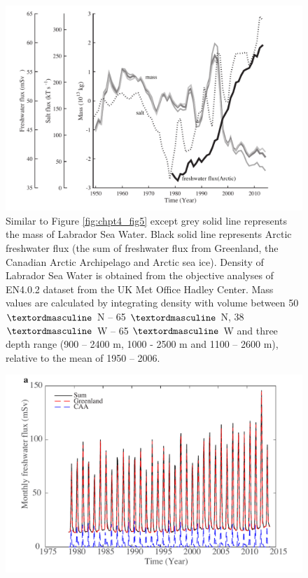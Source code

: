\clearpage
\begin{figure}
	\centering
	\includegraphics[width=120mm]{figs_app/FigS8.pdf}
	\caption[Similar to Figure \ref{fig:chpt4_fig5} except grey solid line represents the mass of Labrador Sea Water.]{Similar to Figure \ref{fig:chpt4_fig5} except grey solid line represents the mass of Labrador Sea Water.  Black solid line represents Arctic freshwater flux (the sum of freshwater flux from Greenland, the Canadian Arctic Archipelago and Arctic sea ice). Density of Labrador Sea Water is obtained from the objective analyses of EN4.0.2 dataset from the UK Met Office Hadley Center\cite[]{good2013en4}.  Mass values are calculated by integrating density with volume between 50 $\textordmasculine$ N – 65 $\textordmasculine$ N, 38 $\textordmasculine$ W – 65 $\textordmasculine$ W and three depth range (900 – 2400 m, 1000 - 2500 m and 1100 – 2600 m), relative to the mean of 1950 – 2006. }
	\label{fig:SI4_fig8}
\end{figure}

\clearpage
\begin{figure}
	\centering
	\includegraphics[width=120mm]{figs_app/FigS9a.pdf}
\end{figure}

